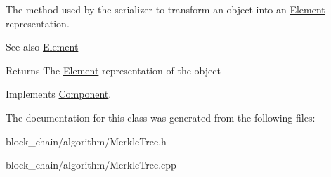 The method used by the serializer to transform an object into an \mbox{\hyperlink{classElement}{Element}} representation. \begin{DoxySeeAlso}{See also}
\mbox{\hyperlink{classElement}{Element}}
\end{DoxySeeAlso}
\begin{DoxyReturn}{Returns}
The \mbox{\hyperlink{classElement}{Element}} representation of the object 
\end{DoxyReturn}


Implements \mbox{\hyperlink{classComponent_a3e63d8c993e417a4af3f56d65ebfc7ea}{Component}}.



The documentation for this class was generated from the following files\+:\begin{DoxyCompactItemize}
\item 
block\+\_\+chain/algorithm/Merkle\+Tree.\+h\item 
block\+\_\+chain/algorithm/Merkle\+Tree.\+cpp\end{DoxyCompactItemize}
